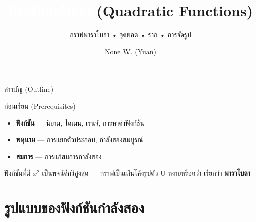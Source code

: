 \documentclass[11pt, aspectratio=169]{beamer}
\title[ฟังก์ชันกำลังสอง]{\textcolor{white}{ฟังก์ชันกำลังสอง} \textcolor{boxBlue!60}{(Quadratic Functions)}}
\subtitle{กราฟพาราโบลา • จุดยอด • ราก • การจัดรูป }
\author[None W. (Yuan)]{None W. (Yuan)}
\date{}
\begin{document}
\begin{frame}[plain]\titlepage\end{frame}
\begin{frame}{สารบัญ (Outline)}\tableofcontents\end{frame}

\begin{frame}{ก่อนเรียน (Prerequisites)}
  \begin{explanation}
    \begin{itemize}
      \item \textbf{ฟังก์ชัน} — นิยาม, โดเมน, เรนจ์, การหาค่าฟังก์ชัน
      \item \textbf{พหุนาม} — การแยกตัวประกอบ, กำลังสองสมบูรณ์
      \item \textbf{สมการ} — การแก้สมการกำลังสอง
    \end{itemize}
  \end{explanation}

  \begin{intuition}
    ฟังก์ชันที่มี $x^2$ เป็นพจน์ดีกรีสูงสุด — กราฟเป็นเส้นโค้งรูปตัว U หงายหรือควํ่า
    เรียกว่า \textbf{พาราโบลา}
  \end{intuition}
\end{frame}

\section{รูปแบบของฟังก์ชันกำลังสอง}
\end{document}

